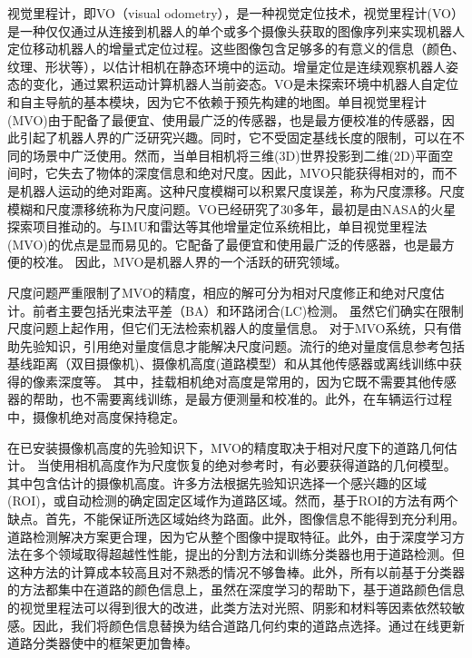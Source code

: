 视觉里程计，即VO（visual odometry），是一种视觉定位技术，视觉里程计(VO）是一种仅仅通过从连接到机器人的单个或多个摄像头获取的图像序列来实现机器人定位\cite{2008Monocular}移动机器人的增量式定位过程。这些图像包含足够多的有意义的信息（颜色、纹理、形状等），以估计相机在静态环境中的运动\cite{Rone2013Mapping}。增量定位是连续观察机器人姿态的变化，通过累积运动计算机器人当前姿态。VO是未探索环境中机器人自定位和自主导航的基本模块，因为它不依赖于预先构建的地图\cite{liu2012finding}\cite{salarian2018improved}。单目视觉里程计(MVO)由于配备了最便宜、使用最广泛的传感器，也是最方便校准的传感器，因此引起了机器人界的广泛研究兴趣。同时，它不受固定基线长度的限制，可以在不同的场景中广泛使用。然而，当单目相机将三维(3D)世界投影到二维(2D)平面空间时，它失去了物体的深度信息和绝对尺度。因此，MVO只能获得相对的，而不是机器人运动的绝对距离。这种尺度模糊可以积累尺度误差，称为尺度漂移。尺度模糊和尺度漂移统称为尺度问题。VO已经研究了30多年，最初是由NASA的火星探索项目推动的\cite{scaramuzza2012visual}。与IMU和雷达等其他增量定位系统相比，单目视觉里程法(MVO)的优点是显而易见的。它配备了最便宜和使用最广泛的传感器，也是最方便的校准。 因此，MVO是机器人界的一个活跃的研究领域。

尺度问题严重限制了MVO\cite{scaramuzza2011vo}的精度，相应的解可分为相对尺度修正和绝对尺度估计。前者主要包括光束法平差（BA）\cite{triggs1999bundle}和环路闭合(LC)检测。 虽然它们确实在限制尺度问题上起作用，但它们无法检索机器人的度量信息。 对于MVO系统，只有借助先验知识，引用绝对量度信息才能解决尺度问题。流行的绝对量度信息参考包括基线距离（双目摄像机)、摄像机高度(道路模型）和从其他传感器或离线训练中获得的像素深度等\cite{Costante2015Exploring}。 其中，挂载相机绝对高度是常用的，因为它既不需要其他传感器的帮助，也不需要离线训练，是最方便测量和校准的。此外，在车辆运行过程中，摄像机绝对高度保持稳定。

在已安装摄像机高度的先验知识下，MVO的精度取决于相对尺度下的道路几何估计。 当使用相机高度作为尺度恢复的绝对参考时，有必要获得道路的几何模型。其中包含估计的摄像机高度。许多方法\cite{kitt2011mono}\cite{Song2015MoncularScale}\cite{zhou2016reliable}根据先验知识选择一个感兴趣的区域(ROI)，或自动检测的确定固定区域\cite{chen2007automatically}作为道路区域。然而，基于ROI的方法有两个缺点。首先，不能保证所选区域始终为路面。此外，图像信息不能得到充分利用。道路检测解决方案更合理，因为它从整个图像中提取特征。此外，由于深度学习方法在多个领域取得超越性性能，\cite{hoiem2007recovering}提出的分割方法和训练分类器也用于道路检测。但这种方法的计算成本较高且对不熟悉的情况不够鲁棒。此外，所有以前基于分类器的方法都集中在道路的颜色信息上，虽然在深度学习的帮助下，基于道路颜色信息的视觉里程法可以得到很大的改进，此类方法对光照、阴影和材料等因素依然较敏感。因此，我们将颜色信息替换为结合道路几何约束的道路点选择。通过在线更新道路分类器使\cite{Lee2015MoncularScale}中的框架更加鲁棒。

